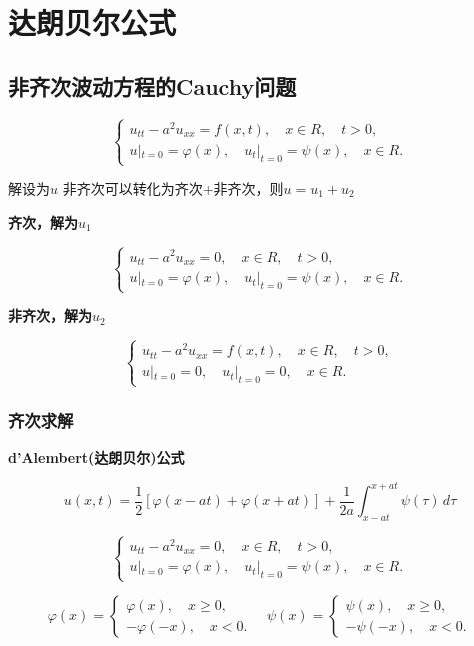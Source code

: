 \section{达朗贝尔公式}

\subsection{非齐次波动方程的Cauchy问题}

\[
\left\{
\begin{aligned}
u_{tt} - a^2 u_{xx} = f(x,t), \quad x \in R , \quad t > 0, \\
u|_{t=0} = \varphi (x), \quad u_t|_{t=0} = \psi (x), \quad x \in R.
\end{aligned}
\right.
\]

解设为$u$
非齐次可以转化为齐次+非齐次，则$u=u_1+u_2$

\textbf{齐次，解为$u_1$}

\[
\left\{
\begin{aligned}
u_{tt} - a^2 u_{xx} = 0, \quad x \in R, \quad t > 0, \\
u|_{t=0} = \varphi (x), \quad u_t|_{t=0} = \psi (x), \quad x \in R.
\end{aligned}
\right.
\]

\textbf{非齐次，解为$u_2$}

\[
\left\{
\begin{aligned}
u_{tt} - a^2 u_{xx} = f(x,t), \quad x \in R, \quad t > 0, \\
u|_{t=0} = 0, \quad u_t|_{t=0} = 0, \quad x \in R.
\end{aligned}
\right.
\]

\subsubsection{齐次求解}

\textbf{d'Alembert(达朗贝尔)公式}

\[
u(x, t) = \frac{1}{2} \left[ \varphi (x - at) + \varphi (x + at) \right] + \frac{1}{2a} \int_{x - at}^{x + at} \psi (\tau ) \, d\tau 
\]

\[
\left\{
\begin{aligned}
u_{tt} - a^2 u_{xx} = 0, \quad x \in R, \quad t > 0, \\
u|_{t=0} = \varphi (x), \quad u_t|_{t=0} = \psi (x), \quad x \in R.
\end{aligned}
\right.
\]

\[
\varphi (x) = 
\left\{
\begin{aligned}
\varphi (x), \quad x \geq 0, \\
-\varphi (-x), \quad x < 0.
\end{aligned}
\right.
\quad
\psi (x) = 
\left\{
\begin{aligned}
\psi (x), \quad x \geq 0, \\
-\psi (-x), \quad x < 0.
\end{aligned}
\right.
\]

